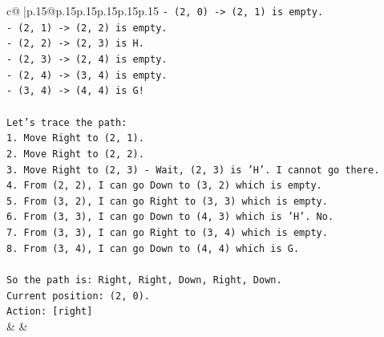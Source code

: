 \documentclass{article}
\begin{document}
{\begin{supertabular}{c@{$\;$}|p{.15\linewidth}@{}p{.15\linewidth}p{.15\linewidth}p{.15\linewidth}p{.15\linewidth}p{.15\linewidth}}
{{{\texttt{{-} (2, 0) {-}> (2, 1) is empty.} \\
\texttt{{-} (2, 1) {-}> (2, 2) is empty.} \\
\texttt{{-} (2, 2) {-}> (2, 3) is H.} \\
\texttt{{-} (2, 3) {-}> (2, 4) is empty.} \\
\texttt{{-} (2, 4) {-}> (3, 4) is empty.} \\
\texttt{{-} (3, 4) {-}> (4, 4) is G!} \\
\\ 
\texttt{Let's trace the path:} \\
\texttt{1. Move Right to (2, 1).} \\
\texttt{2. Move Right to (2, 2).} \\
\texttt{3. Move Right to (2, 3) {-} Wait, (2, 3) is 'H'. I cannot go there.} \\
\texttt{4. From (2, 2), I can go Down to (3, 2) which is empty.} \\
\texttt{5. From (3, 2), I can go Right to (3, 3) which is empty.} \\
\texttt{6. From (3, 3), I can go Down to (4, 3) which is 'H'. No.} \\
\texttt{7. From (3, 3), I can go Right to (3, 4) which is empty.} \\
\texttt{8. From (3, 4), I can go Down to (4, 4) which is G.} \\
\\ 
\texttt{So the path is: Right, Right, Down, Right, Down.} \\
\texttt{Current position: (2, 0).} \\
\texttt{Action: {[}right{]}} \\
            }
        }
    }
    & & \\ \\


\end{supertabular}}
\end{document}
